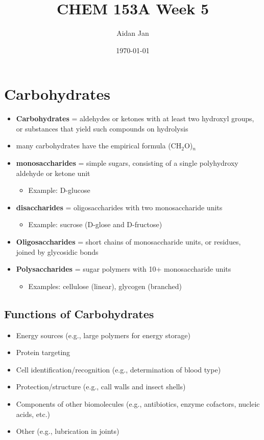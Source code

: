 \documentclass[10pt]{article}
\title{CHEM 153A Week 5}
\author{Aidan Jan}
\date{\today}
\begin{document}
\maketitle

\section*{Carbohydrates}
\begin{itemize}
    \item \textbf{Carbohydrates} = aldehydes or ketones with at least two hydroxyl groups, or substances that yield such compounds on hydrolysis
    \item many carbohydrates have the empirical formula (CH$_2$O)$_n$
    \item \textbf{monosaccharides} = simple sugars, consisting of a single polyhydroxy aldehyde or ketone unit
    \begin{itemize}
        \item Example: D-glucose
    \end{itemize}
    \item \textbf{disaccharides} = oligosaccharides with two monosaccharide units
    \begin{itemize}
        \item Example: sucrose (D-glose and D-fructose)
    \end{itemize}
    \item \textbf{Oligosaccharides} = short chains of monosaccharide units, or residues, joined by glycosidic bonds
    \item \textbf{Polysaccharides} = sugar polymers with 10+ monosaccharide units
    \begin{itemize}
        \item Examples: cellulose (linear), glycogen (branched)
    \end{itemize}
\end{itemize}

\subsection*{Functions of Carbohydrates}
\begin{itemize}
    \item Energy sources (e.g., large polymers for energy storage)
    \item Protein targeting
    \item Cell identification/recognition (e.g., determination of blood type)
    \item Protection/structure (e.g., call walls and insect shells)
    \item Components of other biomolecules (e.g., antibiotics, enzyme cofactors, nucleic acids, etc.)
    \item Other (e.g., lubrication in joints)
\end{itemize}
\end{document}
